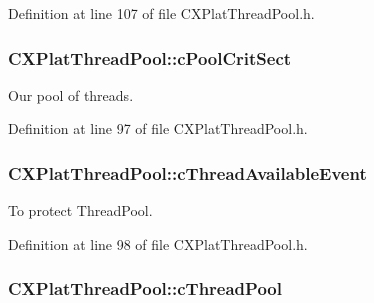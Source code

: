\-Definition at line 107 of file \-C\-X\-Plat\-Thread\-Pool.\-h.

\hypertarget{class_c_x_plat_thread_pool_aa7ae22263bf54d6d7916bb332a63cb36}{
\subsubsection[{c\-Pool\-Crit\-Sect}]{ {\bf \-C\-X\-Plat\-Thread\-Pool\-::c\-Pool\-Crit\-Sect}}}\label{class_c_x_plat_thread_pool_aa7ae22263bf54d6d7916bb332a63cb36}


\-Our pool of threads. 



\-Definition at line 97 of file \-C\-X\-Plat\-Thread\-Pool.\-h.

\hypertarget{class_c_x_plat_thread_pool_a1c511e13b5f134b91494411a20fa1caa}{
\subsubsection[{c\-Thread\-Available\-Event}]{ {\bf \-C\-X\-Plat\-Thread\-Pool\-::c\-Thread\-Available\-Event}}}\label{class_c_x_plat_thread_pool_a1c511e13b5f134b91494411a20fa1caa}


\-To protect \-Thread\-Pool. 



\-Definition at line 98 of file \-C\-X\-Plat\-Thread\-Pool.\-h.

\hypertarget{class_c_x_plat_thread_pool_a64c478883d5d6d7f3a21ef87e9203b8d}{
\subsubsection[{c\-Thread\-Pool}]{ {\bf \-C\-X\-Plat\-Thread\-Pool\-::c\-Thread\-Pool}}}\label{class_c_x_plat_thread_pool_a64c478883d5d6d7f3a21ef87e9203b8d}


